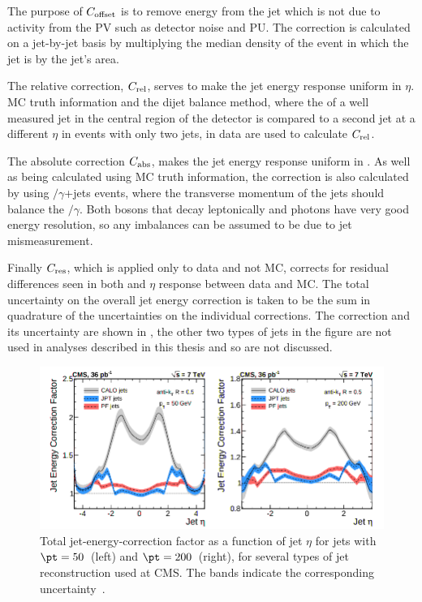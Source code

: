 The purpose of $C_{\rm{offset}}$ is to remove energy from the jet which is not due to activity from the \ac{PV} such as detector noise and \ac{PU}. The correction is calculated on a jet-by-jet basis by multiplying the median \pt density of the event in which the jet is by the jet's area. 

The relative correction, $C_{\rm{rel}}$, serves to make the jet energy response uniform in $\eta$. \ac{MC} truth information and the dijet \pt balance method, where the \pt of a well measured jet in the central region of the detector is compared to a second jet at a different $\eta$ in events with only two jets, in data are used to calculate $C_{\rm{rel}}$.

The absolute correction $C_{\rm{abs}}$, makes the jet energy response uniform in \pt. As well as being calculated using \ac{MC} truth information, the correction is also calculated by using \PZ$/\gamma$+jets events, where the transverse momentum of the jets should balance the \PZ$/\gamma$. Both \PZ bosons that decay leptonically and photons have very good energy resolution, so any imbalances can be assumed to be due to jet mismeasurement.

Finally $C_{\rm{res}}$, which is applied only to data and not \ac{MC}, corrects for residual differences seen in both \pt and $\eta$ response between data and \ac{MC}. The total uncertainty on the overall jet energy correction is taken to be the sum in quadrature of the uncertainties on the individual corrections. The correction and its uncertainty are shown in , the other two types of jets in the figure are not used in analyses described in this thesis and so are not discussed.

\begin{figure}
  \includegraphics[width=1.2\largefigwidth]{plots/obj/jec.png}
  \caption{Total jet-energy-correction factor as a function of jet $\eta$ for jets with $\pt=50$\GeV\, (left) and $\pt=200$\GeV\, (right), for several types of jet reconstruction used at CMS. The bands indicate the corresponding uncertainty~\cite{CMS-JME-10-011}.}
  \label{fig:jec}
\end{figure}
